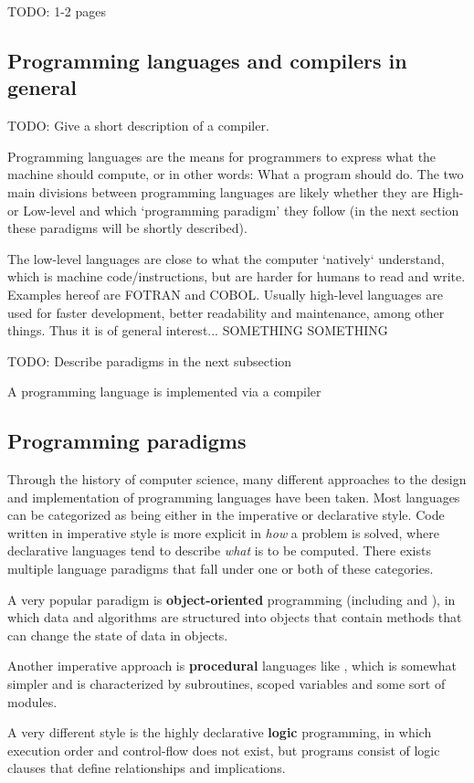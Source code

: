 TODO: 1-2 pages
\subsection{Programming languages and compilers in general}
TODO: Give a short description of a compiler.


Programming languages are the means for programmers to express what the machine should compute, or in other words: What a program should do.
The two main divisions between programming languages are likely whether they are High- or Low-level and which `programming paradigm' they follow (in the next section these paradigms will be shortly described).

The low-level languages are close to what the computer `natively` understand, which is machine code/instructions, but are harder for humans to read and write. Examples hereof are FOTRAN and COBOL. Usually high-level languages are used for faster development, better readability and maintenance, among other things. Thus it is of general interest... SOMETHING SOMETHING


TODO: Describe paradigms in the next subsection

A programming language is implemented via a compiler

\subsection{Programming paradigms}
Through the history of computer science, many different approaches to the design and implementation of programming languages have been taken. Most languages can be categorized as being either in the imperative or declarative style. Code written in imperative style is more explicit in \emph{how} a problem is solved, where declarative languages tend to describe \emph{what} is to be computed. There exists multiple language paradigms that fall under one or both of these categories.

A very popular paradigm is \textbf{object-oriented} programming (including  and ), in which data and algorithms are structured into objects that contain methods that can change the state of data in objects.

Another imperative approach is \textbf{procedural} languages like , which is somewhat simpler and is characterized by subroutines, scoped variables and some sort of modules.

A very different style is the highly declarative \textbf{logic} programming, in which execution order and control-flow does not exist, but programs consist of logic clauses that define relationships and implications.

